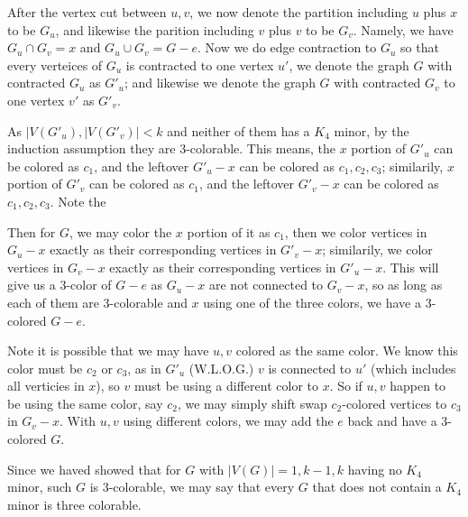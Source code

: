 \documentclass[11pt]{article}
\begin{document}
After the vertex cut between $u, v$, we now denote the partition including $u$ plus $x$ to be $G_u$, and likewise the parition including $v$ plus $v$ to be $G_v$. Namely, we have $G_u \cap G_v = x$ and $G_u \cup G_v = G - e$. Now we do edge contraction to $G_u$ so that every verteices of $G_u$ is contracted to one vertex $u'$, we denote the graph $G$ with contracted $G_u$ as $G'_u$; and likewise we denote the graph $G$ with contracted $G_v$ to one vertex $v'$ as $G'_v$.\newline

As $|V(G'_u), |V(G'_v)| < k$ and neither of them has a $K_4$ minor, by the induction assumption they are 3-colorable. This means, the $x$ portion of $G'_u$ can be colored as $c_1$, and the leftover $G'_u - x$ can be colored as $c_1, c_2, c_3$; similarily,  $x$ portion of $G'_v$ can be colored as $c_1$, and the leftover $G'_v - x$ can be colored as $c_1, c_2, c_3$. Note the

Then for $G$, we may color the $x$ portion of it as $c_1$, then we color vertices in $G_u - x$ exactly as their corresponding vertices in $G'_v - x$; similarily, we color vertices in $G_v - x$ exactly as their corresponding vertices in $G'_u - x$. This will give us a 3-color of $G-e$ as $G_u - x$ are not connected to $G_v - x$, so as long as each of them are 3-colorable and $x$ using one of the three colors, we have a 3-colored $G-e$.

Note it is possible that we may have $u, v$ colored as the same color. We know this color must be $c_2$ or $c_3$, as in $G'_u$ (W.L.O.G.) $v$ is connected to $u'$ (which includes all verticies in $x$), so $v$ must be using a different color to $x$. So if $u, v$ happen to be using the same color, say $c_2$, we may simply shift swap $c_2$-colored vertices to $c_3$ in $G_v - x$. With $u, v$ using different colors, we may add the $e$ back and have a 3-colored $G$.\newline

Since we haved showed that for $G$ with $|V(G)| = 1, k-1, k$ having no $K_4$ minor, such $G$ is 3-colorable, we may say that every $G$ that does not contain a $K_4$ minor is three colorable.



\end{document}
